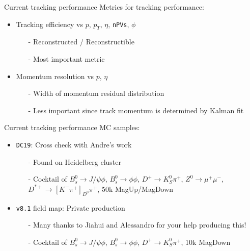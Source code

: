 \documentclass[xcolor={dvipsnames}]{beamer}
\begin{document}
\begin{frame}{Current tracking performance}
  \vspace{0.0cm}
  {\Large Metrics for tracking performance:}
  \vspace{0.2cm}
  \begin{itemize}
    \setlength\itemsep{1.0em}
    \item{Tracking efficiency vs $p$, $p_T$, $\eta$, \texttt{nPVs}, $\phi$}
    \begin{itemize}
      \item[-]{Reconstructed / Reconstructible}
      \item[-]{Most important metric}
    \end{itemize}
    \item{Momentum resolution vs $p$, $\eta$}
    \begin{itemize}
      \item[-]{Width of momentum residual distribution}
      \item[-]{Less important since track momentum is determined by Kalman fit}
    \end{itemize}
  \end{itemize}
\end{frame}

\begin{frame}{Current tracking performance}
  \vspace{0.0cm}
  {\Large MC samples:}
  \vspace{0.2cm}
  \begin{itemize}
    \setlength\itemsep{1.0em}
    \item{\texttt{DC19}: Cross check with Andre's work}
    \begin{itemize}
      \item[-]{Found on Heidelberg cluster}
      \item[-]{Cocktail of $B_s^0\to J/\psi\phi$, $B_s^0\to\phi\phi$, $D^+\to K_S^0\pi^+$, $Z^0\to\mu^+\mu^-$, $D^{\ast+}\to[K^-\pi^+]_{D^0}\pi^+$, 50k MagUp/MagDown}
    \end{itemize}
    \item{\texttt{v8.1} field map: Private production}
    \begin{itemize}
      \item[-]{Many thanks to Jiahui and Alessandro for your help producing this!}
      \item[-]{Cocktail of $B_s^0\to J/\psi\phi$, $B_s^0\to\phi\phi$, $D^+\to K_S^0\pi^+$, 10k MagDown}
    \end{itemize}
  \end{itemize}
\end{frame}
\end{document}
